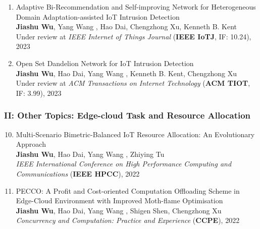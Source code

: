 \documentclass[letterpaper,11pt]{article}
\begin{document}
\begin{enumerate}
  \item Adaptive Bi-Recommendation and Self-improving Network for Heterogeneous Domain Adaptation-assisted IoT Intrusion Detection\\
  \textbf{Jiashu Wu}, Yang Wang \Letter, Hao Dai, Chengzhong Xu, Kenneth B. Kent\\
  Under review at \textit{IEEE Internet of Things Journal} (\textbf{IEEE IoTJ}, IF: 10.24), 2023

  \item Open Set Dandelion Network for IoT Intrusion Detection\\
  \textbf{Jiashu Wu}, Hao Dai, Yang Wang \Letter, Kenneth B. Kent, Chengzhong Xu\\
  Under review at \textit{ACM Transactions on Internet Technology} (\textbf{ACM TIOT}, IF: 3.99), 2023
\end{enumerate}

\iffalse
\subsubsection*{II: Other Topics: Edge-cloud Task and Resource Allocation}
\begin{enumerate}
  \setcounter{enumi}{9}
  \item Multi-Scenario Bimetric-Balanced IoT Resource Allocation: An Evolutionary Approach\\
  \textbf{Jiashu Wu}, Hao Dai, Yang Wang \Letter, Zhiying Tu\\
  \textit{IEEE International Conference on High Performance Computing and Communications} (\textbf{IEEE HPCC}), 2022

  \item PECCO: A Profit and Cost-oriented Computation Offloading Scheme in Edge-Cloud Environment with Improved Moth-flame Optimisation\\
  \textbf{Jiashu Wu}, Hao Dai, Yang Wang \Letter, Shigen Shen, Chengzhong Xu\\
  \textit{Concurrency and Computation: Practice and Experience} (\textbf{CCPE}), 2022
\end{enumerate}
\end{document}
